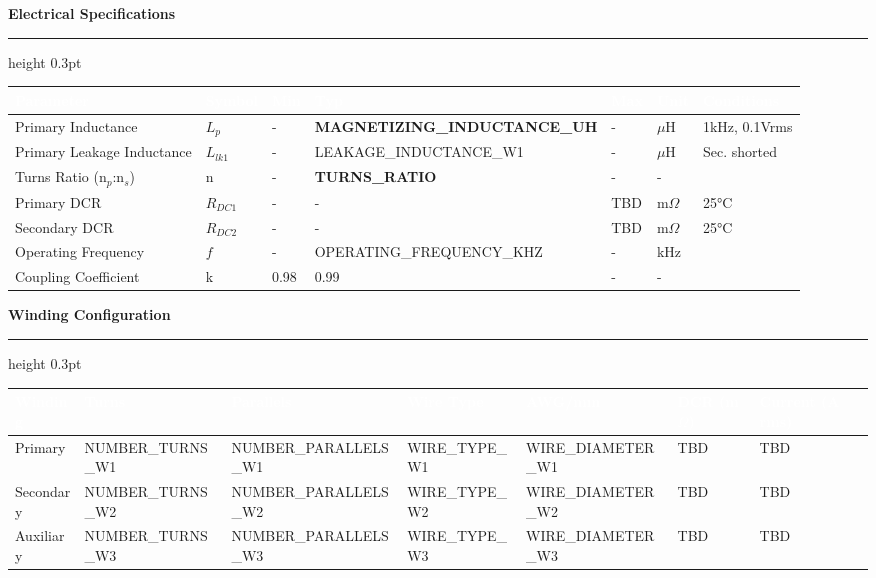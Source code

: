 \documentclass[10pt,a4paper]{article}
\newcommand{\sectiontitle}[1]{%
    \vspace{3mm}%
    {\large\bfseries\color{primary}#1}%
    \vspace{1mm}%
    \hrule height 0.3pt%
    \vspace{2mm}%
}
\newcommand{\specvalue}[1]{\textbf{#1}}
\begin{document}
\vspace{4mm}

\sectiontitle{Electrical Specifications}

\renewcommand{\arraystretch}{1.25}
{\footnotesize
\begin{tabular}{|L{42mm}|C{12mm}|C{20mm}|C{20mm}|C{20mm}|C{15mm}|L{30mm}|}
\hline
{}
\textcolor{white}{\textbf{Parameter}} & 
\textcolor{white}{\textbf{Symbol}} & 
\textcolor{white}{\textbf{Min}} & 
\textcolor{white}{\textbf{Typ}} & 
\textcolor{white}{\textbf{Max}} & 
\textcolor{white}{\textbf{Unit}} & 
\textcolor{white}{\textbf{Conditions}} \\
\hline
Primary Inductance & $L_p$ & - & \specvalue{{{MAGNETIZING_INDUCTANCE_UH}}} & - & $\mu$H & 1kHz, 0.1Vrms \\
Primary Leakage Inductance & $L_{lk1}$ & - & {{LEAKAGE_INDUCTANCE_W1}} & - & $\mu$H & Sec. shorted \\
Turns Ratio (n$_p$:n$_s$) & n & - & \specvalue{{{TURNS_RATIO}}} & - & - & \\
Primary DCR & $R_{DC1}$ & - & - & TBD & m$\Omega$ & 25°C \\
Secondary DCR & $R_{DC2}$ & - & - & TBD & m$\Omega$ & 25°C \\
Operating Frequency & $f$ & - & {{OPERATING_FREQUENCY_KHZ}} & - & kHz & \\
Coupling Coefficient & k & 0.98 & 0.99 & - & - & \\
\hline
\end{tabular}
}

\vspace{4mm}

\sectiontitle{Winding Configuration}

{\footnotesize
\begin{tabular}{|L{25mm}|C{18mm}|C{18mm}|C{20mm}|C{18mm}|C{20mm}|C{25mm}|}
\hline
{}
\textcolor{white}{\textbf{Winding}} & 
\textcolor{white}{\textbf{Turns}} & 
\textcolor{white}{\textbf{Parallels}} & 
\textcolor{white}{\textbf{Wire Type}} & 
\textcolor{white}{\textbf{AWG/mm}} &
\textcolor{white}{\textbf{DCR (m$\Omega$)}} &
\textcolor{white}{\textbf{Current (A rms)}} \\
\hline
Primary & {{NUMBER_TURNS_W1}} & {{NUMBER_PARALLELS_W1}} & {{WIRE_TYPE_W1}} & {{WIRE_DIAMETER_W1}} & TBD & TBD \\
Secondary & {{NUMBER_TURNS_W2}} & {{NUMBER_PARALLELS_W2}} & {{WIRE_TYPE_W2}} & {{WIRE_DIAMETER_W2}} & TBD & TBD \\
Auxiliary & {{NUMBER_TURNS_W3}} & {{NUMBER_PARALLELS_W3}} & {{WIRE_TYPE_W3}} & {{WIRE_DIAMETER_W3}} & TBD & TBD \\
\hline
\end{tabular}
}
\end{document}
